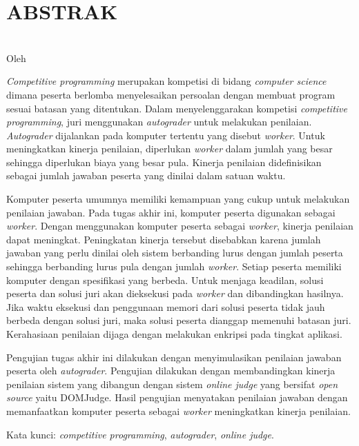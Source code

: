 \clearpage

\chapter*{\uppercase{Abstrak}}

\begin{center}
    \textbf{\large {\MakeUppercase{\thetitle}}} \\
    \normalsize Oleh \theauthor
\end{center}

\singlespacing
\par \textit{Competitive programming} merupakan kompetisi di bidang \textit{computer science} dimana peserta berlomba menyelesaikan persoalan dengan membuat program sesuai batasan yang ditentukan. Dalam menyelenggarakan kompetisi \textit{competitive programming}, juri menggunakan \textit{autograder} untuk melakukan penilaian. \textit{Autograder} dijalankan pada komputer tertentu yang disebut \textit{worker}. Untuk meningkatkan kinerja penilaian, diperlukan \textit{worker} dalam jumlah yang besar sehingga diperlukan biaya yang besar pula. Kinerja penilaian didefinisikan sebagai jumlah jawaban peserta yang dinilai dalam satuan waktu.

\par Komputer peserta umumnya memiliki kemampuan yang cukup untuk melakukan penilaian jawaban. Pada tugas akhir ini, komputer peserta digunakan sebagai \textit{worker}. Dengan menggunakan komputer peserta sebagai \textit{worker}, kinerja penilaian dapat meningkat. Peningkatan kinerja tersebut disebabkan karena jumlah jawaban yang perlu dinilai oleh sistem berbanding lurus dengan jumlah peserta sehingga berbanding lurus pula dengan jumlah \textit{worker}. Setiap peserta memiliki komputer dengan spesifikasi yang berbeda. Untuk menjaga keadilan, solusi peserta dan solusi juri akan dieksekusi pada \textit{worker} dan dibandingkan hasilnya. Jika waktu eksekusi dan penggunaan memori dari solusi peserta tidak jauh berbeda dengan solusi juri, maka solusi peserta dianggap memenuhi batasan juri. Kerahasiaan penilaian dijaga dengan melakukan enkripsi pada tingkat aplikasi.

\par Pengujian tugas akhir ini dilakukan dengan menyimulasikan penilaian jawaban peserta oleh \textit{autograder}. Pengujian dilakukan dengan membandingkan kinerja penilaian sistem yang dibangun dengan sistem \textit{online judge} yang bersifat \textit{open source} yaitu DOMJudge. Hasil pengujian menyatakan penilaian jawaban dengan memanfaatkan komputer peserta sebagai \textit{worker} meningkatkan kinerja penilaian.

\par Kata kunci: \textit{competitive programming}, \textit{autograder}, \textit{online judge}.

\clearpage
\onehalfspacing